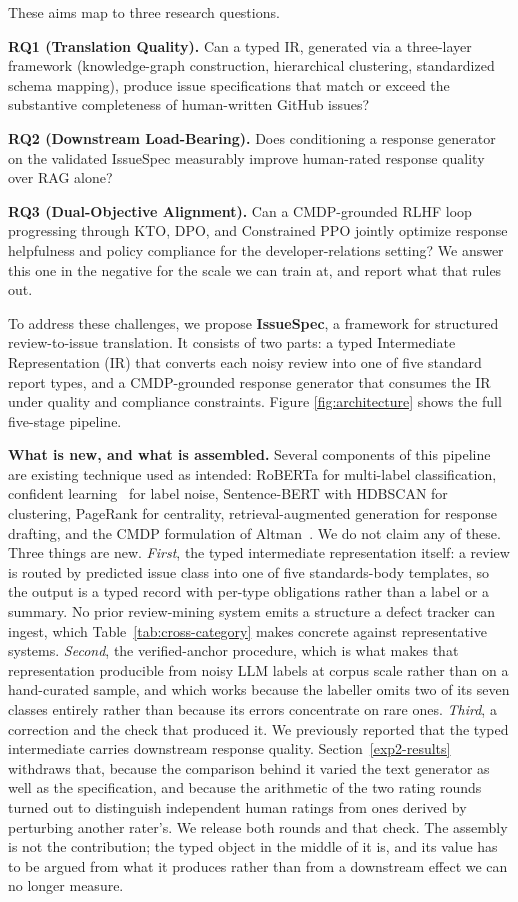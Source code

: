 \documentclass[preprint,12pt]{elsarticle}
\begin{document}
These aims map to three research questions.

\textbf{RQ1 (Translation Quality).} Can a typed IR, generated via a three-layer framework (knowledge-graph construction, hierarchical clustering,
standardized schema mapping), produce issue specifications that match or exceed the substantive completeness of human-written GitHub issues?

\textbf{RQ2 (Downstream Load-Bearing).} Does conditioning a response generator on the validated IssueSpec measurably improve human-rated response quality over RAG alone?

\textbf{RQ3 (Dual-Objective Alignment).} Can a CMDP-grounded RLHF loop progressing through KTO, DPO, and Constrained PPO jointly optimize response helpfulness and policy compliance for the
developer-relations setting? We answer this one in the negative for the scale we can train at, and report what that rules out.

To address these challenges, we propose \textbf{IssueSpec}, a framework for structured review-to-issue translation. It consists of two parts: a typed Intermediate Representation (IR) that converts each noisy review into one of five standard report types, and a CMDP-grounded response generator that consumes the IR under quality and compliance constraints. Figure \ref{fig:architecture} shows the full five-stage pipeline.

\textbf{What is new, and what is assembled.} Several components of this pipeline are existing
technique used as intended: RoBERTa for multi-label classification, confident
learning~\cite{northcutt2021confident} for label noise, Sentence-BERT with HDBSCAN for
clustering, PageRank for centrality, retrieval-augmented generation for response drafting, and
the CMDP formulation of Altman~\cite{altman2021constrained}. We do not claim any of these. Three things are
new. \emph{First}, the typed intermediate representation itself: a review is routed by predicted
issue class into one of five standards-body templates, so the output is a typed record with
per-type obligations rather than a label or a summary. No prior review-mining system emits a
structure a defect tracker can ingest, which Table~\ref{tab:cross-category} makes concrete
against representative systems. \emph{Second}, the verified-anchor procedure, which is what makes
that representation producible from noisy LLM labels at corpus scale rather than on a hand-curated
sample, and which works because the labeller omits two of its seven classes entirely rather than because its errors concentrate on rare ones.
\emph{Third}, a correction and the check that produced it. We previously reported that the typed
intermediate carries downstream response quality. Section~\ref{exp2-results} withdraws that,
because the comparison behind it varied the text generator as well as the specification, and
because the arithmetic of the two rating rounds turned out to distinguish independent human
ratings from ones derived by perturbing another rater's. We release both rounds and that check.
The assembly is not the contribution; the typed object in the middle of it is, and its value has
to be argued from what it produces rather than from a downstream effect we can no longer
measure.
\end{document}
